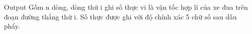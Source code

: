 Output
Gồm n dòng, dòng thứ i ghi số thực vi là vận tốc hợp lí của xe đua trên đoạn đường thẳng thứ i. Số thực được ghi với độ chính xác 5 chữ số sau dấu phẩy.